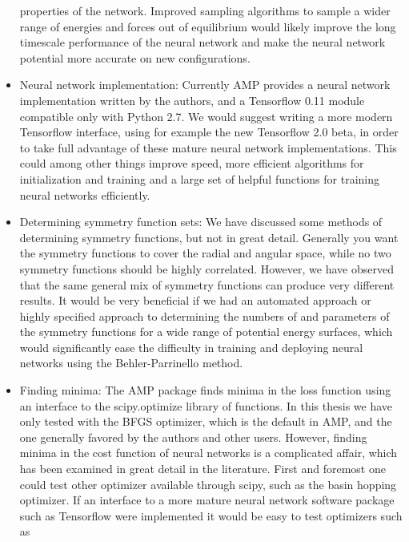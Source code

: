 \begin{itemize}
        properties of the network. Improved sampling algorithms to
        sample a wider range of energies and forces out of equilibrium
        would likely improve the long timescale performance of the neural
        network and make the neural network potential more accurate on
        new configurations.
    \item Neural network implementation:
        Currently AMP provides a neural network implementation written
        by the authors, and a Tensorflow 0.11 module compatible only
        with Python 2.7. We would suggest writing a more modern Tensorflow
        interface, using for example the new Tensorflow 2.0 beta,
        in order to take full advantage of these mature neural network
        implementations. This could among other things improve speed,
        more efficient algorithms for initialization and training
        and a large set of helpful functions for training neural networks
        efficiently.
    \item Determining symmetry function sets:
        We have discussed some methods of determining symmetry functions,
        but not in great detail. Generally you want the symmetry functions
        to cover the radial and angular space, while no two symmetry functions
        should be highly correlated. However, we have observed that
        the same general mix of symmetry functions can produce very
        different results. It would be very beneficial if we had an automated
        approach or highly specified approach to determining the numbers of
        and parameters of the symmetry functions for a wide range of
        potential energy surfaces, which would significantly ease the difficulty
        in training and deploying neural networks using the Behler-Parrinello
        method.
   \item Finding minima:
        The AMP package finds minima in the loss function using an
        interface to the scipy.optimize library of functions.
        In this thesis we have only tested with the BFGS optimizer,
        which is the default in AMP, and the one generally favored
        by the authors and other users. However, finding minima in the cost
        function of neural networks is a complicated affair, which has
        been examined in great detail in the literature.
        First and foremost one could test other optimizer available
        through scipy, such as the basin hopping optimizer.
        If an interface to a more mature neural network software package
        such as Tensorflow were implemented it would be easy to test optimizers such as 

\end{itemize}
